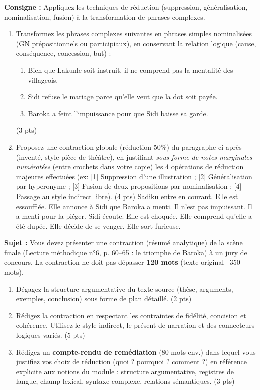 \documentclass[11pt]{article}
\begin{document}
\begin{exercice}
\textbf{Consigne :} Appliquez les techniques de réduction (suppression, généralisation, nominalisation, fusion) à la transformation de phrases complexes.
\begin{enumerate}
    \item Transformez les phrases complexes suivantes en phrases simples nominalisées (GN prépositionnels ou participiaux), en conservant la relation logique (cause, conséquence, concession, but) :
    \begin{enumerate}
        \item Bien que Lakunle soit instruit, il ne comprend pas la mentalité des villageois.
        \item Sidi refuse le mariage parce qu'elle veut que la dot soit payée.
        \item Baroka a feint l'impuissance pour que Sidi baisse sa garde.
    \end{enumerate}
    (3 pts)
    \item Proposez une contraction globale (réduction 50\%) du paragraphe ci-après (inventé, style pièce de théâtre), en justifiant \textit{sous forme de notes marginales numérotées} (entre crochets dans votre copie) les 4 opérations de réduction majeures effectuées (ex: [1] Suppression d'une illustration ; [2] Généralisation par hyperonyme ; [3] Fusion de deux propositions par nominalisation ; [4] Passage au style indirect libre). (4 pts)
    \vspace{0.2cm}
    \noindent \og Sadiku entre en courant. Elle est essoufflée. Elle annonce à Sidi que Baroka a menti. Il n'est pas impuissant. Il a menti pour la piéger. Sidi écoute. Elle est choquée. Elle comprend qu'elle a été dupée. Elle décide de se venger. Elle sort furieuse. \fg{}
\end{enumerate}
\end{exercice}

\begin{exercice}
\textbf{Sujet :} Vous devez présenter une contraction (résumé analytique) de la scène finale (Lecture méthodique n°6, p. 60--65 : le triomphe de Baroka) à un jury de concours. La contraction ne doit pas dépasser \textbf{120 mots} (texte original ~350 mots).
\begin{enumerate}
    \item Dégagez la structure argumentative du texte source (thèse, arguments, exemples, conclusion) sous forme de plan détaillé. (2 pts)
    \item Rédigez la contraction en respectant les contraintes de fidélité, concision et cohérence. Utilisez le style indirect, le présent de narration et des connecteurs logiques variés. (5 pts)
    \item Rédigez un \textbf{compte-rendu de remédiation} (80 mots env.) dans lequel vous justifiez vos choix de réduction (quoi ? pourquoi ? comment ?) en référence explicite aux notions du module : structure argumentative, registres de langue, champ lexical, syntaxe complexe, relations sémantiques. (3 pts)
\end{enumerate}
\end{exercice}
\end{document}
